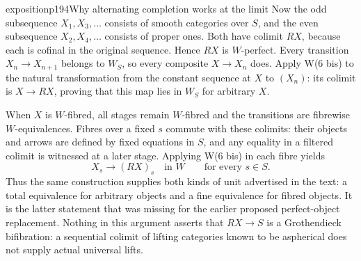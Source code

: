 \begin{dcomment}{exposition}{p194}{Why alternating completion works at the limit}
Now the odd subsequence $X_1,X_3,\ldots$ consists of smooth categories over $S$, and the even subsequence $X_2,X_4,\ldots$ consists of proper ones. Both have colimit $RX$, because each is cofinal in the original sequence. Hence $RX$ is $W$-perfect. Every transition $X_n\to X_{n+1}$ belongs to $W_S$, so every composite $X\to X_n$ does. Apply W(6 bis) to the natural transformation from the constant sequence at $X$ to $(X_n)$: its colimit is $X\to RX$, proving that this map lies in $W_S$ for arbitrary $X$.

When $X$ is $W$-fibred, all stages remain $W$-fibred and the transitions are fibrewise $W$-equivalences. Fibres over a fixed $s$ commute with these colimits: their objects and arrows are defined by fixed equations in $S$, and any equality in a filtered colimit is witnessed at a later stage. Applying W(6 bis) in each fibre yields
\[
 X_s\longrightarrow (RX)_s\quad\text{in }W
 \qquad\text{for every }s\in S.
\]
Thus the same construction supplies both kinds of unit advertised in the text: a total equivalence for arbitrary objects and a fine equivalence for fibred objects. It is the latter statement that was missing for the earlier proposed perfect-object replacement. Nothing in this argument asserts that $RX\to S$ is a Grothendieck bifibration: a sequential colimit of lifting categories known to be aspherical does not supply actual universal lifts.
\end{dcomment}

